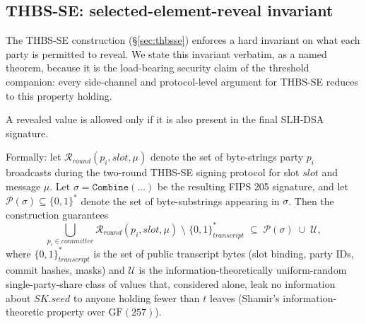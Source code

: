 \subsection{THBS-SE: selected-element-reveal invariant}
\label{sec:security:thbsse-reveal}

The THBS-SE construction (\S\ref{sec:thbsse}) enforces a hard
invariant on what each party is permitted to reveal. We state
this invariant verbatim, as a named theorem, because it is the
load-bearing security claim of the threshold companion: every
side-channel and protocol-level argument for THBS-SE reduces to
this property holding.

\begin{theorem}
\label{thm:thbsse-selected-element-reveal}
A revealed value is allowed only if it is also present in the
final SLH-DSA signature.
\end{theorem}

Formally: let $\mathcal{R}_{\textit{round}}(p_i, \mathit{slot}, \mu)$
denote the set of byte-strings party $p_i$ broadcasts during the
two-round THBS-SE signing protocol for slot
$\mathit{slot}$ and message $\mu$. Let
$\sigma = \texttt{Combine}(\dots)$ be the resulting FIPS 205
signature, and let
$\mathcal{P}(\sigma) \subseteq \{0,1\}^*$ denote the set of
byte-substrings appearing in $\sigma$. Then the construction
guarantees
\begin{equation}
  \bigcup_{p_i \in \mathit{committee}}
    \mathcal{R}_{\textit{round}}(p_i, \mathit{slot}, \mu)
  \;\setminus\;
  \{0, 1\}^*_{\textit{transcript}}
  \;\subseteq\;
  \mathcal{P}(\sigma)
  \;\cup\;
  \mathcal{U},
\label{eq:thbsse-invariant}
\end{equation}
where $\{0,1\}^*_{\textit{transcript}}$ is the set of public
transcript bytes (slot binding, party IDs, commit hashes, masks)
and $\mathcal{U}$ is the information-theoretically uniform-random
single-party-share class of values that, considered alone, leak
no information about $\mathit{SK.seed}$ to anyone holding fewer
than $t$ leaves (Shamir's information-theoretic property over
$\mathrm{GF}(257)$).

